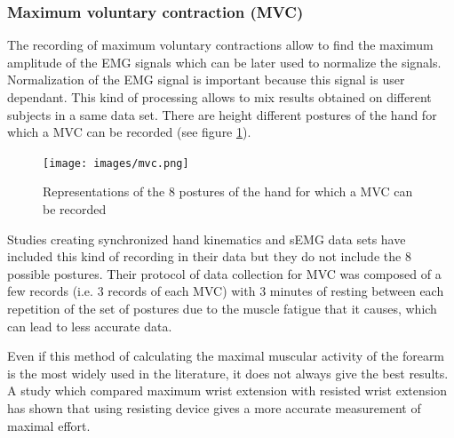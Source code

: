 \documentclass{article}
\begin{document}
\subsubsection{Maximum voluntary contraction (MVC)}

The recording of maximum voluntary contractions allow to find the maximum amplitude of the EMG signals which can be later used to normalize the signals. Normalization of the EMG signal is important because this signal is user dependant. This kind of processing allows to mix results obtained on different subjects in a same data set.
There are height different postures of the hand for which a MVC can be recorded (see figure \ref{fig:mvc}).

\begin{figure}[H]
    \centering
    \texttt{[image: images/mvc.png]}
    \caption{Representations of the 8 postures of the hand for which a MVC can be recorded}
    \label{fig:mvc}
\end{figure}

Studies creating synchronized hand kinematics and sEMG data sets have included this kind of recording in their data \cite{ref:Ngeo2014, ref:KinMusUji} but they do not include the 8 possible postures. Their protocol of data collection for MVC was composed of a few records (i.e. 3 records of each MVC) with 3 minutes of resting between each repetition of the set of postures due to the muscle fatigue that it causes, which can lead to less accurate data.

Even if this method of calculating the maximal muscular activity of the forearm is the most widely used in the literature, it does not always give the best results. A study which compared maximum wrist extension with resisted wrist extension \cite{ref:mvc} has shown that using resisting device gives a more accurate measurement of maximal effort.
\end{document}
